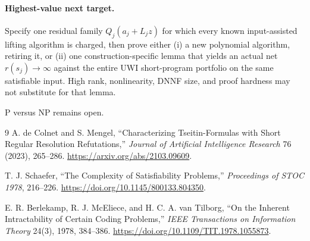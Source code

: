 \documentclass[11pt]{article}
\begin{document}
\paragraph{Highest-value next target.}
Specify one residual family $Q_j(a_j+L_jz)$ for which every known
input-assisted lifting algorithm is charged, then prove either (i) a new
polynomial algorithm, retiring it, or (ii) one construction-specific lemma
that yields an actual net $r(s_j)\to\infty$ against the entire UWI short-program
portfolio on the same satisfiable input.  High rank, nonlinearity, DNNF size,
and proof hardness may not substitute for that lemma.

P versus NP remains open.

\begin{thebibliography}{9}
A. de Colnet and S. Mengel,
``Characterizing Tseitin-Formulas with Short Regular Resolution Refutations,''
\emph{Journal of Artificial Intelligence Research} 76 (2023), 265--286.
\url{https://arxiv.org/abs/2103.09609}.

T. J. Schaefer,
``The Complexity of Satisfiability Problems,''
\emph{Proceedings of STOC 1978}, 216--226.
\url{https://doi.org/10.1145/800133.804350}.

E. R. Berlekamp, R. J. McEliece, and H. C. A. van Tilborg,
``On the Inherent Intractability of Certain Coding Problems,''
\emph{IEEE Transactions on Information Theory} 24(3), 1978, 384--386.
\url{https://doi.org/10.1109/TIT.1978.1055873}.
\end{thebibliography}
\end{document}
